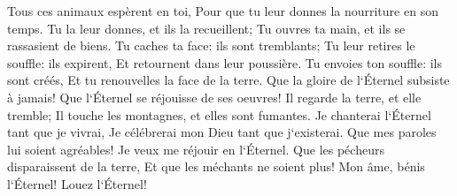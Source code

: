 \verse Tous ces animaux espèrent en toi, Pour que tu leur donnes la nourriture en son temps. 
\verse Tu la leur donnes, et ils la recueillent; Tu ouvres ta main, et ils se rassasient de biens. 
\verse Tu caches ta face: ils sont tremblants; Tu leur retires le souffle: ils expirent, Et retournent dans leur poussière. 
\verse Tu envoies ton souffle: ils sont créés, Et tu renouvelles la face de la terre. 
\verse Que la gloire de l`Éternel subsiste à jamais! Que l`Éternel se réjouisse de ses oeuvres! 
\verse Il regarde la terre, et elle tremble; Il touche les montagnes, et elles sont fumantes. 
\verse Je chanterai l`Éternel tant que je vivrai, Je célébrerai mon Dieu tant que j`existerai. 
\verse Que mes paroles lui soient agréables! Je veux me réjouir en l`Éternel. 
\verse Que les pécheurs disparaissent de la terre, Et que les méchants ne soient plus! Mon âme, bénis l`Éternel! Louez l`Éternel! 

\chapter{}

